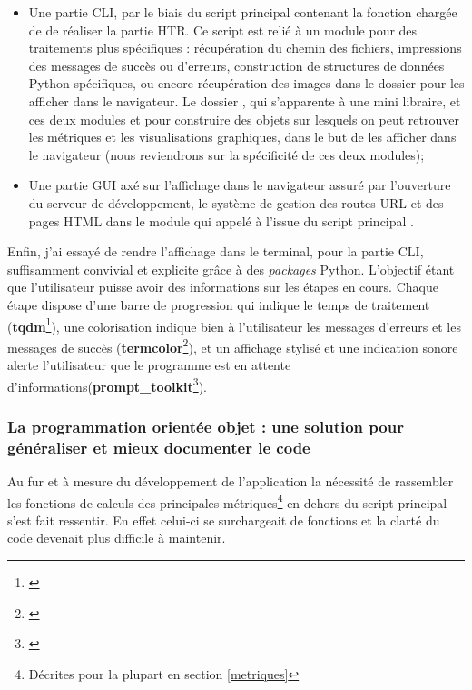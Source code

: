 \begin{itemize}
    \item Une partie CLI, par le biais du script principal  contenant la fonction chargée de de réaliser la partie HTR. Ce script est relié à un module pour des traitements plus spécifiques  : récupération du chemin des fichiers, impressions des messages de succès ou d'erreurs, construction de structures de données Python spécifiques, ou encore récupération des images dans le dossier  pour les afficher dans le navigateur. Le dossier , qui s'apparente à une mini libraire, et ces deux modules  et  pour construire des objets sur lesquels on peut retrouver les métriques et les visualisations graphiques, dans le but de les afficher dans le navigateur (nous reviendrons sur la spécificité de ces deux modules);\\
     \item Une partie GUI axé sur l'affichage dans le navigateur assuré par l'ouverture du serveur de développement, le système de gestion des routes URL et des pages HTML dans le module  qui appelé à l'issue du script principal .
\end{itemize}
\bigskip
Enfin, j'ai essayé de rendre l'affichage dans le terminal, pour la partie CLI, suffisamment convivial et explicite grâce à des \textit{packages} Python. L'objectif étant que l'utilisateur puisse avoir des informations sur les étapes en cours. Chaque étape dispose d'une barre de progression qui indique le temps de traitement (\textbf{tqdm}\footnote{\cite{noauthor_tqdm_nodate}}), une colorisation indique bien à l'utilisateur les messages d'erreurs et les messages de succès (\textbf{termcolor}\footnote{\cite{noauthor_termcolor_nodate}}), et un affichage stylisé et une indication sonore alerte l'utilisateur que le programme est en attente d'informations(\textbf{prompt\_toolkit}\footnote{\cite{noauthor_prompt-toolkit_nodate}}). 

\subsubsection{La programmation orientée objet : une solution pour généraliser et mieux documenter le code}

Au fur et à mesure du développement de l'application la nécessité de rassembler les fonctions de calculs des principales métriques\footnote{Décrites pour la plupart en section \ref{metriques}} en dehors du script principal  s'est fait ressentir. En effet celui-ci se surchargeait de fonctions et la clarté du code devenait plus difficile à maintenir. 

